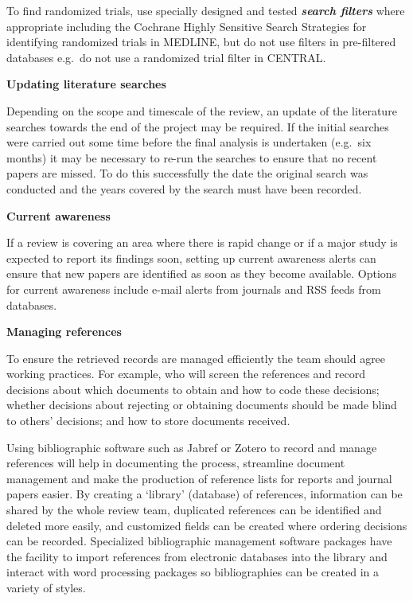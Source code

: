 \documentclass[
  10pt,
  a4paper,
  DIV=11,
  numbers=noendperiod]{scrreprt}
\begin{document}
To find randomized trials, use specially designed and tested
\textbf{\emph{search filters}} where appropriate including the Cochrane
Highly Sensitive Search Strategies for identifying randomized trials in
MEDLINE, but do not use filters in pre-filtered databases e.g.~do not
use a randomized trial filter in CENTRAL.

\textbf{Updating literature searches}

Depending on the scope and timescale of the review, an update of the
literature searches towards the end of the project may be required. If
the initial searches were carried out some time before the final
analysis is undertaken (e.g.~six months) it may be necessary to re-run
the searches to ensure that no recent papers are missed. To do this
successfully the date the original search was conducted and the years
covered by the search must have been recorded.

\textbf{Current awareness}

If a review is covering an area where there is rapid change or if a
major study is expected to report its findings soon, setting up current
awareness alerts can ensure that new papers are identified as soon as
they become available. Options for current awareness include e-mail
alerts from journals and RSS feeds from databases.

\textbf{Managing references}

To ensure the retrieved records are managed efficiently the team should
agree working practices. For example, who will screen the references and
record decisions about which documents to obtain and how to code these
decisions; whether decisions about rejecting or obtaining documents
should be made blind to others' decisions; and how to store documents
received.

Using bibliographic software such as Jabref or Zotero to record and
manage references will help in documenting the process, streamline
document management and make the production of reference lists for
reports and journal papers easier. By creating a `library' (database) of
references, information can be shared by the whole review team,
duplicated references can be identified and deleted more easily, and
customized fields can be created where ordering decisions can be
recorded. Specialized bibliographic management software packages have
the facility to import references from electronic databases into the
library and interact with word processing packages so bibliographies can
be created in a variety of styles.
\end{document}

